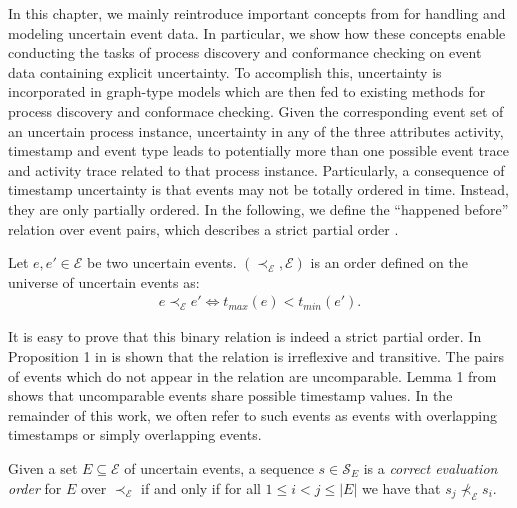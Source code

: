 In this chapter, we mainly reintroduce important concepts from \citep{mining,discovery,efficient} for handling and modeling uncertain event data.
In particular, we show how these concepts enable conducting the tasks of process discovery and conformance checking on event data containing explicit uncertainty.
To accomplish this, uncertainty is incorporated in graph-type models which are then fed to existing methods for process discovery and conformace checking.
Given the corresponding event set of an uncertain process instance, uncertainty in any of the three attributes activity, timestamp and event type leads to potentially more than one possible event trace and activity trace related to that process instance.
Particularly, a consequence of timestamp uncertainty is that events may not be totally ordered in time.
Instead, they are only partially ordered.
In the following, we define the ``happened before'' relation over event pairs, which describes a strict partial order \cite{conformance}. 

\begin{definition} \label{spo}
Let $e, e' \in \mathcal{E}$ be two uncertain events.
$(\prec_{\mathcal{E}},\mathcal{E})$ is an order defined on the universe of uncertain events as:
\begin{align*}
e \prec_{\mathcal{E}} e' \Leftrightarrow t_{max}(e) < t_{min}(e').
\end{align*}
\end{definition}

It is easy to prove that this binary relation is indeed a strict partial order.
In Proposition 1 in \cite{conformance} is shown that the relation is irreflexive and transitive.
The pairs of events which do not appear in the relation are uncomparable.
Lemma 1 from \cite{conformance} shows that uncomparable events share possible timestamp values.
In the remainder of this work, we often refer to such events as events with overlapping timestamps or simply overlapping events.

\begin{definition}
Given a set $E \subseteq \mathcal{E}$ of uncertain events, a sequence $s \in \mathcal{S}_E$ is a \emph{correct evaluation order} for $E$ over $\prec_{\mathcal{E}}$ if and only if for all $1 \leq i < j \leq |E|$ we have that $s_j \not \prec_{\mathcal{E}} s_i$. 
\end{definition}

